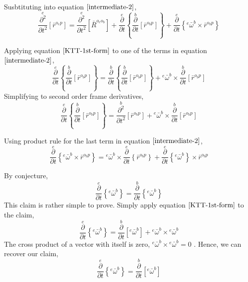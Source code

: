 Susbtituting into equation $\ref{intermediate-2}$,
\begin{equation}\overset{e}{\frac{\partial^{2}}{\partial t^{2}}}[\bar{r}^{o_{e}p}]    =    \overset{e}{\frac{\partial^{2}}{\partial t^{2}}}[\bar{R}^{o_{e}o_{b}}]     +  \overset{e}{\frac{\partial}{\partial t}}\left\{\overset{b}{\frac{\partial}{\partial t}}[\bar{r}^{o_{b}p}]\right\}      +   \overset{e}{\frac{\partial}{\partial t}}\left\{{}^{e}\bar{\omega}^{b}\times\bar{r}^{o_{b}p}\right\}\label{inter-4}\end{equation}

Applying equation $\ref{KTT-1st-form}$ to one of the terms in equation $\ref{intermediate-2}$,
$$\overset{e}{\frac{\partial}{\partial t}}\left\{\overset{b}{\frac{\partial}{\partial t}}[\bar{r}^{o_{b}p}]\right\} = \overset{b}{\frac{\partial}{\partial t}}\left\{\overset{b}{\frac{\partial}{\partial t}}[\bar{r}^{o_{b}p}]\right\} + {}^{e}\bar{\omega}^{b}\times\overset{b}{\frac{\partial}{\partial t}}[\bar{r}^{o_{b}p}]$$
Simplifying to second order frame derivatives,
\begin{equation}\overset{e}{\frac{\partial}{\partial t}}\left\{\overset{b}{\frac{\partial}{\partial t}}[\bar{r}^{o_{b}p}]\right\} = \overset{b}{\frac{\partial^{2}}{\partial t^{2}}}[\bar{r}^{o_{b}p}] + {}^{e}\bar{\omega}^{b}\times\overset{b}{\frac{\partial}{\partial t}}[\bar{r}^{o_{b}p}]\label{whammu-1}\end{equation}

Using product rule for the last term in equation $\ref{intermediate-2}$, 
\begin{equation}\overset{e}{\frac{\partial}{\partial t}}\left\{{}^{e}\bar{\omega}^{b}\times\bar{r}^{o_{b}p}\right\} = {}^{e}\bar{\omega}^{b}\times\overset{e}{\frac{\partial}{\partial t}}\left\{\bar{r}^{o_{b}p}\right\}  +  \overset{e}{\frac{\partial}{\partial t}}\left\{{}^{e}\bar{\omega}^{b}\right\}\times\bar{r}^{o_{b}p}\label{Inter-3}\end{equation}

By conjecture,
$$\overset{e}{\frac{\partial}{\partial t}}\left\{{}^{e}\bar{\omega}^{b}\right\} = \overset{b}{\frac{\partial}{\partial t}}\left\{{}^{e}\bar{\omega}^{b}\right\}$$
This claim is rather simple to prove. 
Simply apply equation $\ref{KTT-1st-form}$ to the claim, 
$$\overset{e}{\frac{\partial}{\partial t}}\left\{{}^{e}\bar{\omega}^{b}\right\} = \overset{b}{\frac{\partial}{\partial t}}[{}^{e}\bar{\omega}^{b}] + {}^{e}\bar{\omega}^{b}\times{}^{e}\bar{\omega}^{b}$$
The cross product of a vector with itself is zero, $\displaystyle {}^{e}\bar{\omega}^{b}\times{}^{e}\bar{\omega}^{b} = 0$ . 
Hence, we can recover our claim,
$$\overset{e}{\frac{\partial}{\partial t}}\left\{{}^{e}\bar{\omega}^{b}\right\} = \overset{b}{\frac{\partial}{\partial t}}[{}^{e}\bar{\omega}^{b}]$$

